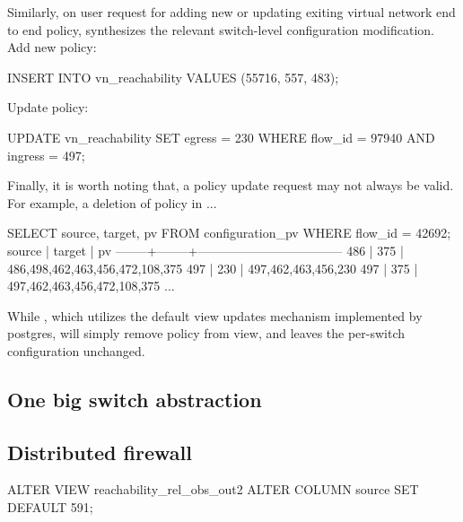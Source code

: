 Similarly, on user request for adding new or updating exiting virtual
network end to end policy, \Sys synthesizes the relevant switch-level
configuration modification.
Add new policy:
\begin{sql}
INSERT INTO vn_reachability VALUES (55716, 557, 483);  
\end{sql}

Update policy:
\begin{sql}
UPDATE vn_reachability SET egress = 230
        WHERE flow_id = 97940 AND ingress = 497;  
\end{sql}

Finally, it is worth noting that, a policy update request may not
always be valid. For example, a deletion of policy  in ... 

\begin{sql}
SELECT source, target, pv FROM configuration_pv WHERE flow_id = 42692;
 source | target |                pv                 
--------+--------+-----------------------------------
    486 |    375 | {486,498,462,463,456,472,108,375}
    497 |    230 | {497,462,463,456,230}
    497 |    375 | {497,462,463,456,472,108,375}
    ...
\end{sql}

While \Sys, which utilizes the default view updates mechanism
implemented by postgres, will simply remove policy  from  view, and leaves the per-switch
configuration unchanged. 

\subsection{One big switch abstraction}

\subsection{Distributed firewall}

\begin{sql}
ALTER VIEW reachability_rel_obs_out2 ALTER COLUMN source SET DEFAULT 591;  
\end{sql}
